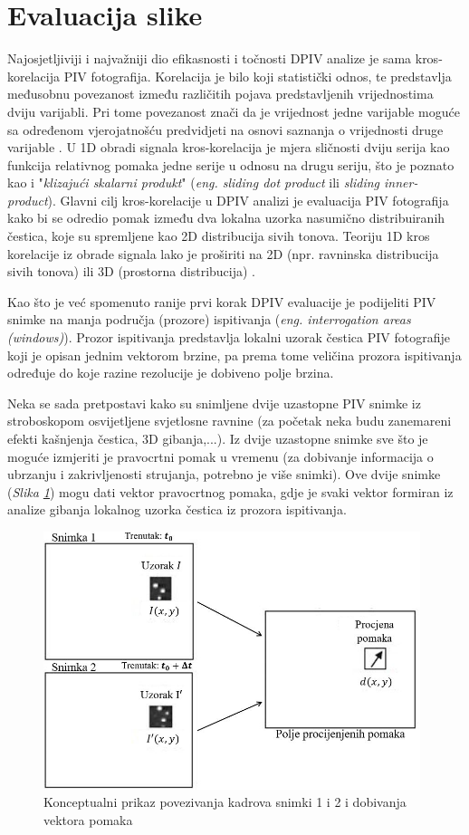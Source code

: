 \section{Evaluacija slike}
Najosjetljiviji i najvažniji dio efikasnosti i točnosti DPIV analize je sama kros-korelacija PIV fotografija. Korelacija je bilo koji statistički odnos, te predstavlja međusobnu povezanost između različitih pojava predstavljenih vrijednostima dviju varijabli. Pri tome povezanost znači da je vrijednost jedne varijable moguće sa određenom vjerojatnošću predvidjeti na osnovi saznanja o vrijednosti druge varijable \cite{wiki:Correlation}. U 1D obradi signala kros-korelacija je mjera sličnosti dviju serija kao funkcija relativnog pomaka jedne serije u odnosu na drugu seriju, što je poznato kao i "\textit{klizajući skalarni produkt}" (\textit{eng. sliding dot product} ili \textit{sliding inner-product}). Glavni cilj kros-korelacije u DPIV analizi je evaluacija PIV fotografija kako bi se odredio pomak između dva lokalna uzorka nasumično distribuiranih čestica, koje su spremljene kao 2D distribucija sivih tonova. Teoriju 1D kros korelacije iz obrade signala lako je proširiti na 2D (npr. ravninska distribucija sivih tonova) ili 3D (prostorna distribucija) \cite{raffel2018_book}.
\par
Kao što je već spomenuto ranije prvi korak DPIV evaluacije je podijeliti PIV snimke na manja područja (prozore) ispitivanja (\textit{eng. interrogation areas (windows)}). Prozor ispitivanja predstavlja lokalni uzorak čestica PIV fotografije koji je opisan jednim vektorom brzine, pa prema tome veličina prozora ispitivanja određuje do koje razine rezolucije je dobiveno polje brzina.
\par
Neka se sada pretpostavi kako su snimljene dvije uzastopne PIV snimke iz stroboskopom osvijetljene svjetlosne ravnine (za početak neka budu zanemareni efekti kašnjenja čestica, 3D gibanja,...). Iz dvije uzastopne snimke sve što je moguće izmjeriti je pravocrtni pomak u vremenu (za dobivanje informacija o ubrzanju i zakrivljenosti strujanja, potrebno je više snimki). Ove dvije snimke (\textit{Slika \ref{sl:2.7}}) mogu dati vektor pravocrtnog pomaka, gdje je svaki vektor formiran iz analize gibanja lokalnog uzorka čestica iz prozora ispitivanja.
\begin{figure}[h]  
	\centering
	\includegraphics[width=11cm]{./2_DPIV/2_7OpisGibanja.jpg} 
	\caption{Konceptualni prikaz povezivanja kadrova snimki 1 i 2 i dobivanja vektora pomaka\cite{raffel2018_book}}
	\label{sl:2.7}
\end{figure}
